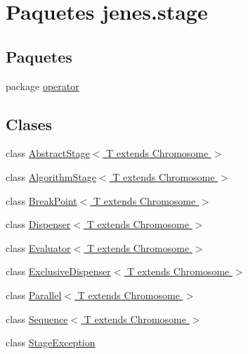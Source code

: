 \hypertarget{namespacejenes_1_1stage}{\section{Paquetes jenes.\-stage}
\label{namespacejenes_1_1stage}
}
\subsection*{Paquetes}
\begin{DoxyCompactItemize}
\item 
package \hyperlink{namespacejenes_1_1stage_1_1operator}{operator}
\end{DoxyCompactItemize}
\subsection*{Clases}
\begin{DoxyCompactItemize}
\item 
class \hyperlink{classjenes_1_1stage_1_1_abstract_stage_3_01_t_01extends_01_chromosome_01_4}{Abstract\-Stage$<$ T extends Chromosome $>$}
\item 
class \hyperlink{classjenes_1_1stage_1_1_algorithm_stage_3_01_t_01extends_01_chromosome_01_4}{Algorithm\-Stage$<$ T extends Chromosome $>$}
\item 
class \hyperlink{classjenes_1_1stage_1_1_break_point_3_01_t_01extends_01_chromosome_01_4}{Break\-Point$<$ T extends Chromosome $>$}
\item 
class \hyperlink{classjenes_1_1stage_1_1_dispenser_3_01_t_01extends_01_chromosome_01_4}{Dispenser$<$ T extends Chromosome $>$}
\item 
class \hyperlink{classjenes_1_1stage_1_1_evaluator_3_01_t_01extends_01_chromosome_01_4}{Evaluator$<$ T extends Chromosome $>$}
\item 
class \hyperlink{classjenes_1_1stage_1_1_exclusive_dispenser_3_01_t_01extends_01_chromosome_01_4}{Exclusive\-Dispenser$<$ T extends Chromosome $>$}
\item 
class \hyperlink{classjenes_1_1stage_1_1_parallel_3_01_t_01extends_01_chromosome_01_4}{Parallel$<$ T extends Chromosome $>$}
\item 
class \hyperlink{classjenes_1_1stage_1_1_sequence_3_01_t_01extends_01_chromosome_01_4}{Sequence$<$ T extends Chromosome $>$}
\item 
class \hyperlink{classjenes_1_1stage_1_1_stage_exception}{Stage\-Exception}
\end{DoxyCompactItemize}
